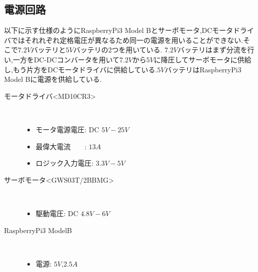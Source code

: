 \subsection{電源回路}
以下に示す仕様のようにRaspberryPi3 Model Bとサーボモータ,DCモータドライバではそれれぞれ定格電圧が異なるため同一の電源を用いることができない.そこで$7.2\unit{V}$バッテリと$5\unit{V}$バッテリの2つを用いている.
$7.2\unit{V}$バッテリはまず分流を行い,一方をDC-DCコンバータを用いて$7.2\unit{V}$から$5\unit{V}$に降圧してサーボモータに供給し,もう片方をDCモータドライバに供給している.$5\unit{V}$バッテリはRaspberryPi3 Model Bに電源を供給している.
\begin{description}
    \item[モータドライバ\textless MD10CR3\textgreater \cite{motordriver}]\mbox{}\\
    \vspace{-5mm}
        \begin{itemize}
            \item モータ電源電圧: DC $5\unit{V}-25\unit{V}$
            \item 最偉大電流　　: $13\unit{A}$
            \item ロジック入力電圧: $3.3\unit{V}-5\unit{V}$
        \end{itemize}
    \item[サーボモータ\textless GWS03T/2BBMG\textgreater]\mbox{}\\
    \vspace{-5mm}
         \begin{itemize}
            \item 駆動電圧: DC $4.8\unit{V}-6\unit{V}$
        \end{itemize}
     \item[RaspberryPi3 ModelB\cite{rpi}]\mbox{}\\
     \vspace{-5mm}
         \begin{itemize}
            \item 電源: $5\unit{V}$,$2.5\unit{A}$
        \end{itemize}

\end{description}


